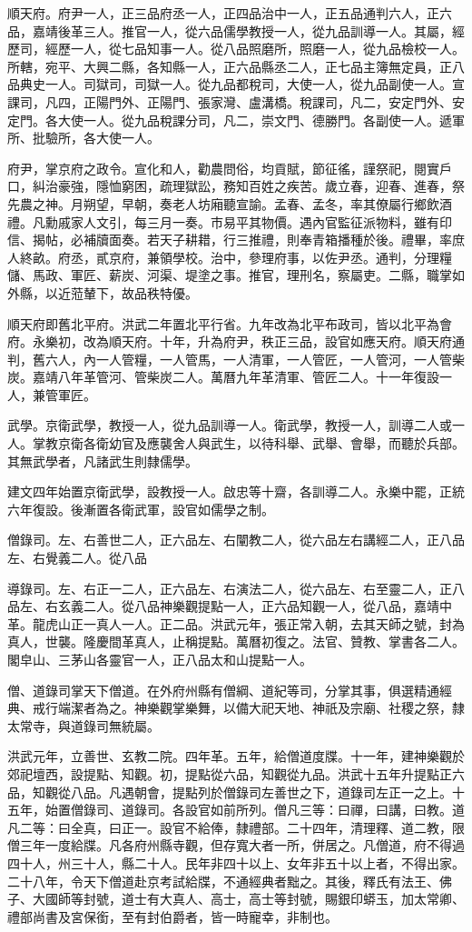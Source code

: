 順天府。府尹一人，正三品府丞一人，正四品治中一人，正五品通判六人，正六品，嘉靖後革三人。推官一人，從六品儒學教授一人，從九品訓導一人。其屬，經歷司，經歷一人，從七品知事一人。從八品照磨所，照磨一人，從九品檢校一人。所轄，宛平、大興二縣，各知縣一人，正六品縣丞二人，正七品主簿無定員，正八品典史一人。司獄司，司獄一人。從九品都稅司，大使一人，從九品副使一人。宣課司，凡四，正陽門外、正陽門、張家灣、盧溝橋。稅課司，凡二，安定門外、安定門。各大使一人。從九品稅課分司，凡二，崇文門、德勝門。各副使一人。遞軍所、批驗所，各大使一人。

府尹，掌京府之政令。宣化和人，勸農問俗，均貢賦，節征徭，謹祭祀，閱實戶口，糾治豪強，隱恤窮困，疏理獄訟，務知百姓之疾苦。歲立春，迎春、進春，祭先農之神。月朔望，早朝，奏老人坊廂聽宣諭。孟春、孟冬，率其僚屬行鄉飲酒禮。凡勳戚家人文引，每三月一奏。市易平其物價。遇內官監征派物料，雖有印信、揭帖，必補牘面奏。若天子耕耤，行三推禮，則奉青箱播種於後。禮畢，率庶人終畝。府丞，貳京府，兼領學校。治中，參理府事，以佐尹丞。通判，分理糧儲、馬政、軍匠、薪炭、河渠、堤塗之事。推官，理刑名，察屬吏。二縣，職掌如外縣，以近蒞輦下，故品秩特優。

順天府即舊北平府。洪武二年置北平行省。九年改為北平布政司，皆以北平為會府。永樂初，改為順天府。十年，升為府尹，秩正三品，設官如應天府。順天府通判，舊六人，內一人管糧，一人管馬，一人清軍，一人管匠，一人管河，一人管柴炭。嘉靖八年革管河、管柴炭二人。萬曆九年革清軍、管匠二人。十一年復設一人，兼管軍匠。

武學。京衛武學，教授一人，從九品訓導一人。衛武學，教授一人，訓導二人或一人。掌教京衛各衛幼官及應襲舍人與武生，以待科舉、武舉、會舉，而聽於兵部。其無武學者，凡諸武生則隸儒學。

建文四年始置京衛武學，設教授一人。啟忠等十齋，各訓導二人。永樂中罷，正統六年復設。後漸置各衛武軍，設官如儒學之制。

僧錄司。左、右善世二人，正六品左、右闡教二人，從六品左右講經二人，正八品左、右覺義二人。從八品

導錄司。左、右正一二人，正六品左、右演法二人，從六品左、右至靈二人，正八品左、右玄義二人。從八品神樂觀提點一人，正六品知觀一人，從八品，嘉靖中革。龍虎山正一真人一人。正二品。洪武元年，張正常入朝，去其天師之號，封為真人，世襲。隆慶間革真人，止稱提點。萬曆初復之。法官、贊教、掌書各二人。閣皁山、三茅山各靈官一人，正八品太和山提點一人。

僧、道錄司掌天下僧道。在外府州縣有僧綱、道紀等司，分掌其事，俱選精通經典、戒行端潔者為之。神樂觀掌樂舞，以備大祀天地、神祇及宗廟、社稷之祭，隸太常寺，與道錄司無統屬。

洪武元年，立善世、玄教二院。四年革。五年，給僧道度牒。十一年，建神樂觀於郊祀壇西，設提點、知觀。初，提點從六品，知觀從九品。洪武十五年升提點正六品，知觀從八品。凡遇朝會，提點列於僧錄司左善世之下，道錄司左正一之上。十五年，始置僧錄司、道錄司。各設官如前所列。僧凡三等：曰禪，曰講，曰教。道凡二等：曰全真，曰正一。設官不給俸，隸禮部。二十四年，清理釋、道二教，限僧三年一度給牒。凡各府州縣寺觀，但存寬大者一所，併居之。凡僧道，府不得過四十人，州三十人，縣二十人。民年非四十以上、女年非五十以上者，不得出家。二十八年，令天下僧道赴京考試給牒，不通經典者黜之。其後，釋氏有法王、佛子、大國師等封號，道士有大真人、高士，高士等封號，賜銀印蟒玉，加太常卿、禮部尚書及宮保銜，至有封伯爵者，皆一時寵幸，非制也。


